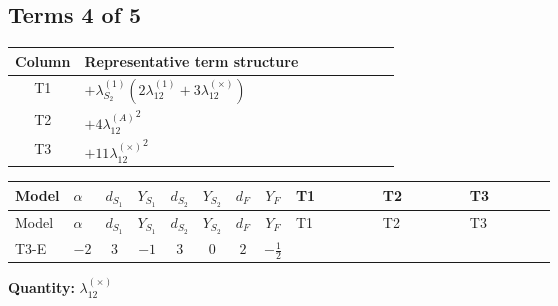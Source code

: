 \documentclass[8pt]{article}
\begin{document}
\begin{landscape}
\subsection*{Terms 4 of 5}
\begin{center}
\begin{tabular}{@{}c >{\raggedright\arraybackslash}p{0.82\linewidth}@{}}
\toprule
Column & Representative term structure \\
\midrule
T1 & \(\displaystyle +{\lambda_{S_2}^{(1)}} (2 {\lambda_{12}^{(1)}}+3 {\lambda_{12}^{(\times)}})\) \\
\midrule
T2 & \(\displaystyle +4 {\lambda_{12}^{(A)}}^2\) \\
\midrule
T3 & \(\displaystyle +11 {\lambda_{12}^{(\times)}}^2\) \\
\midrule
\bottomrule
\end{tabular}
\end{center}
\smallskip
\tiny
\begin{longtable}{@{}llcccccc >{\raggedright\arraybackslash}p{0.21\linewidth} >{\raggedright\arraybackslash}p{0.21\linewidth} >{\raggedright\arraybackslash}p{0.21\linewidth}@{}}
\toprule
Model & $\alpha$ & $d_{S_1}$ & $Y_{S_1}$ & $d_{S_2}$ & $Y_{S_2}$ & $d_F$ & $Y_F$ & T1 & T2 & T3 \\
\midrule
\endfirsthead
\toprule
Model & $\alpha$ & $d_{S_1}$ & $Y_{S_1}$ & $d_{S_2}$ & $Y_{S_2}$ & $d_F$ & $Y_F$ & T1 & T2 & T3 \\
\midrule
\endhead
T3-E & $-2$ & $3$ & $-1$ & $3$ & $0$ & $2$ & $-\frac{1}{2}$ & \scriptsize\adjustbox{max width=\linewidth}{$\begin{gathered} +{\lambda_{S_2}^{(1)}} (2 {\lambda_{12}^{(1)}}+3 {\lambda_{12}^{(\times)}})\end{gathered}$} & \scriptsize\adjustbox{max width=\linewidth}{$\begin{gathered} +4 {\lambda_{12}^{(A)}}^2\end{gathered}$} & \scriptsize\adjustbox{max width=\linewidth}{$\begin{gathered} +11 {\lambda_{12}^{(\times)}}^2\end{gathered}$} \\
\midrule
\bottomrule
\end{longtable}
\clearpage
\noindent\textbf{Quantity: }$\lambda_{12}^{(\times)}$\par\smallskip

\end{landscape}
\end{document}
